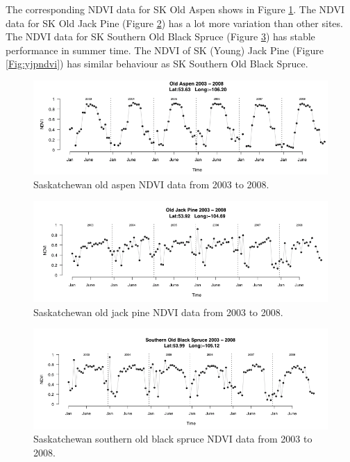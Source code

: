 \documentclass{article}\usepackage[]{graphicx}\usepackage[]{color}
\begin{document}
The corresponding NDVI data for SK Old Aspen shows in Figure \ref{Fig:oapndvi}. The NDVI data for SK Old Jack Pine (Figure \ref{Fig:ojpndvi}) has a lot more variation than other sites. The NDVI data for SK Southern Old Black Spruce (Figure \ref{Fig:soundvi}) has stable performance in summer time. The NDVI of SK (Young) Jack Pine (Figure \ref{Fig:yjpndvi}) has similar behaviour as SK  Southern Old Black Spruce.



\begin{figure}[!ht]
\centering
\includegraphics[width=14cm]{oapndvi.png}
\caption{Saskatchewan old aspen NDVI data from 2003 to 2008.}
\label{Fig:oapndvi}
\end{figure}



\begin{figure}[!ht]
\centering
\includegraphics[width=14cm]{ojpndvi.png}
\caption{Saskatchewan old jack pine NDVI data from 2003 to 2008.}
\label{Fig:ojpndvi}
\end{figure}



\begin{figure}[!ht]
\centering
\includegraphics[width=14cm]{soundvi.png}
\caption{Saskatchewan southern old black spruce NDVI data from 2003 to 2008.}
\label{Fig:soundvi}
\end{figure}
\end{document}
